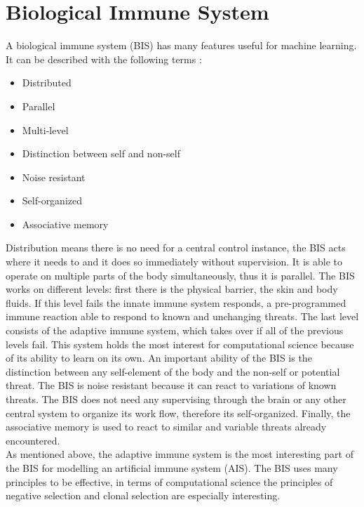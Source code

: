 %
%
% 
% 
% 


\chapter{Biological Immune System}
\label{chap:bis}

\nocite{DEC02}
\nocite{NAN08}
\nocite{PAM17}
\nocite{RIFF09}

A biological immune system (BIS) has many features useful for machine learning. It can be described with the following terms \cite{tan2016artificial}:
\begin{itemize}
	\item 	Distributed
	\item 	Parallel
	\item 	Multi-level
	\item 	Distinction between self and non-self
	\item 	Noise resistant
	\item 	Self-organized
	\item 	Associative memory
	
\end{itemize}
Distribution means there is no need for a central control instance, the BIS acts where it needs to and it does so immediately without supervision. It is able to operate on multiple parts of the body simultaneously, thus it is parallel. The BIS works on different levels: first there is the physical barrier, the skin and body fluids. If this level fails the innate immune system responds, a pre-programmed immune reaction able to respond to known and unchanging threats. The last level consists of the adaptive immune system, which takes over if all of the previous levels fail. This system holds the most interest for computational science because of its ability to learn on its own. An important ability of the BIS is the distinction between any self-element of the body and the non-self or potential threat. The BIS is noise resistant because it can react to variations of known threats. The BIS does not need any supervising through the brain or any other central system to organize its work flow, therefore its self-organized. Finally, the associative memory is used to react to similar and variable threats already encountered.\\
As mentioned above, the adaptive immune system is the most interesting part of the BIS for modelling an artificial immune system (AIS). The BIS uses many principles to be effective, in terms of computational science the principles of negative selection and clonal selection are especially interesting.

